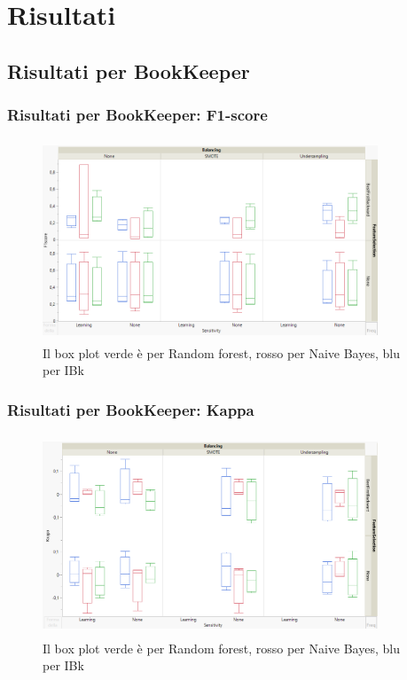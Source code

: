 \documentclass{beamer}
\begin{document}
\section{Risultati}
\subsection{Risultati per BookKeeper}
\begin{frame}
	\frametitle{Risultati per BookKeeper: F1-score}
	
	\centering
	\begin{figure}
	\includegraphics[width=10cm, height=6cm]{bookkeeper-f1score}
	\caption{Il box plot verde è per Random forest, rosso per Naive Bayes, blu per IBk}
	\end{figure}
\end{frame}

\begin{frame}
	\frametitle{Risultati per BookKeeper: Kappa}
	
	\centering
	\begin{figure}
	\includegraphics[width=10cm, height=6cm]{bookkeeper-kappa}
	\caption{Il box plot verde è per Random forest, rosso per Naive Bayes, blu per IBk}
	\end{figure}
\end{frame}
\end{document}
